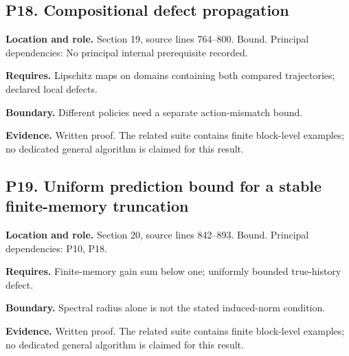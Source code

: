 \documentclass[11pt,oneside,openany]{book}
\numberwithin{equation}{section}
\begin{document}
\par\noindent\begin{minipage}{\textwidth}
\subsection{P18. Compositional defect
propagation}\label{LSMRegister:p18.-compositional-defect-propagation}

\textbf{Location and role.} Section 19, source lines 764--800. Bound.
Principal dependencies: No principal internal prerequisite recorded.

\textbf{Requires.} Lipschitz maps on domains containing both compared
trajectories; declared local defects.

\textbf{Boundary.} Different policies need a separate action-mismatch
bound.

\textbf{Evidence.} Written proof. The related suite contains finite
block-level examples; no dedicated general algorithm is claimed for this
result.
\end{minipage}\par\medskip

\par\noindent\begin{minipage}{\textwidth}
\subsection{P19. Uniform prediction bound for a stable finite-memory
truncation}\label{LSMRegister:p19.-uniform-prediction-bound-for-a-stable-finite-memory-truncation}

\textbf{Location and role.} Section 20, source lines 842--893. Bound.
Principal dependencies: P10, P18.

\textbf{Requires.} Finite-memory gain sum below one; uniformly bounded
true-history defect.

\textbf{Boundary.} Spectral radius alone is not the stated induced-norm
condition.

\textbf{Evidence.} Written proof. The related suite contains finite
block-level examples; no dedicated general algorithm is claimed for this
result.
\end{minipage}\par\medskip
\end{document}
